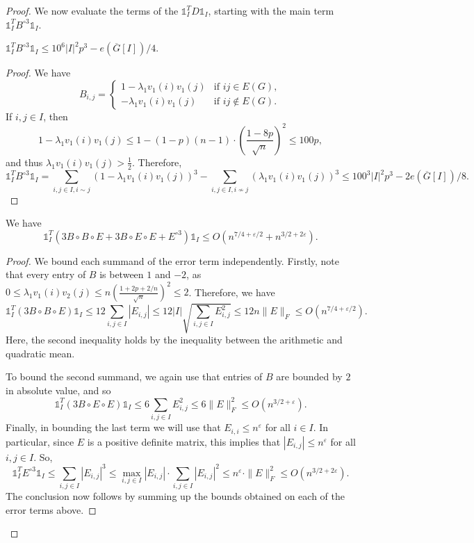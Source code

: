 \documentclass[10pt,a4paper]{amsart}
\newcommand{\eps}{\varepsilon}
\begin{document}
\begin{proof}
We now evaluate the terms of the $\mathds{1}_I^T D \mathds{1}_I$, starting with the main term $\mathds{1}_I^T B^{\circ 3} \mathds{1}_I$. 
\begin{claim} \label{claim:main term}
$\mathds{1}^T_I B^{\circ 3}\mathds{1}_I\leq 10^6|I|^2p^3-e(\overline{G}[I])/4$.
\end{claim}
\begin{proof}
We have 
$$B_{i,j}=\begin{cases}
    1-\lambda_1v_1(i)v_1(j) &\mbox{if }ij\in E(G),\\
    -\lambda_1v_1(i)v_1(j) &\mbox{if }ij\notin E(G).
\end{cases}$$
If $i,j\in I$, then
$$1-\lambda_1v_1(i)v_1(j)\leq 1-(1-p)(n-1)\cdot \left(\frac{1-8p}{\sqrt{n}}\right)^2\leq 100p,$$
and  thus $\lambda_1v_1(i)v_1(j)>\frac{1}{2}$. Therefore,
$$\mathds{1}^T_I B^{\circ 3}\mathds{1}_I=\sum_{i,j\in I, i\sim j} (1-\lambda_1v_1(i)v_1(j))^3-\sum_{i,j\in I, i\not\sim j}(\lambda_1v_1(i)v_1(j))^3\leq 100^3|I|^2p^3-2e(\overline{G}[I])/8.$$
\end{proof}

\begin{claim} \label{claim:error term}
We have
\[\mathds{1}^T_I (3B\circ B\circ E+3B\circ E\circ E+E^{\circ 3})\mathds{1}_I\leq O(n^{7/4+\eps/2}+n^{3/2+2\eps}).\]
\end{claim}
\begin{proof}
We bound each summand of the error term independently. Firstly, note that every entry of $B$ is between $1$ and $-2$, as $0\leq \lambda_1v_1(i)v_2(j)\leq n\left(\frac{1+2p+2/n}{\sqrt{n}}\right)^2\leq 2$. Therefore, we have 
$$\mathds{1}^T_I (3B\circ B\circ E)\mathds{1}_I\leq 12\sum_{i,j\in I} |E_{i,j}|\leq 12|I|\sqrt{\sum_{i,j\in I}E_{i,j}^2}\leq 12n\|E\|_F\leq O(n^{7/4+\eps/2}).$$
Here, the second inequality holds by the inequality between the arithmetic and quadratic mean.

To bound the second summand, we again use that entries of $B$ are bounded by $2$ in absolute value, and so
$$\mathds{1}^T_I (3B\circ E\circ E)\mathds{1}_I\leq 6\sum_{i,j\in I} E_{i,j}^2\leq 6\|E\|_F^2\leq O(n^{3/2+\eps}).$$
Finally, in bounding the last term we will use that $E_{i, i}\leq n^\eps$ for all $i\in I$. In particular, since $E$ is a positive definite matrix, this implies that $|E_{i, j}|\leq n^{\eps}$ for all $i, j\in I$. So,
$$\mathds{1}^T_I E^{\circ 3}\mathds{1}_I\leq \sum_{i,j\in I} |E_{i,j}|^3\leq \max_{i,j\in I} |E_{i,j}|\cdot \sum_{i,j\in I}|E_{i,j}|^2\leq n^\eps \cdot \|E\|_F^2\leq O(n^{3/2+2\eps}).$$
The conclusion now follows by summing up the bounds obtained on each of the error terms above.
\end{proof}


\end{proof}
\end{document}
